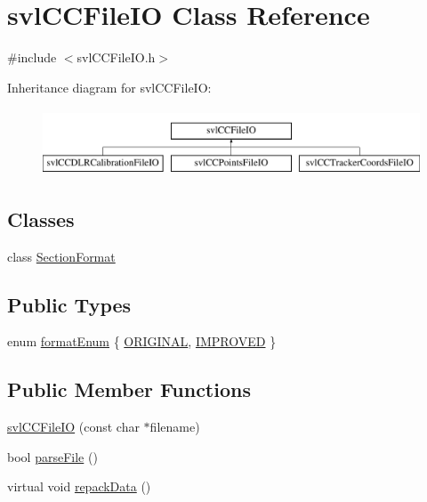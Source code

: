 \hypertarget{classsvl_c_c_file_i_o}{\section{svl\-C\-C\-File\-I\-O Class Reference}
\label{classsvl_c_c_file_i_o}
}


{\ttfamily \#include $<$svl\-C\-C\-File\-I\-O.\-h$>$}

Inheritance diagram for svl\-C\-C\-File\-I\-O\-:\begin{figure}[H]
\begin{center}
\leavevmode
\includegraphics[height=2.000000cm]{db/d3d/classsvl_c_c_file_i_o}
\end{center}
\end{figure}
\subsection*{Classes}
\begin{DoxyCompactItemize}
\item 
class \hyperlink{classsvl_c_c_file_i_o_1_1_section_format}{Section\-Format}
\end{DoxyCompactItemize}
\subsection*{Public Types}
\begin{DoxyCompactItemize}
\item 
enum \hyperlink{classsvl_c_c_file_i_o_a611d26ef01a82b0e1712aacd0994dfca}{format\-Enum} \{ \hyperlink{classsvl_c_c_file_i_o_a611d26ef01a82b0e1712aacd0994dfcaa7a3cb50b00a1186d5597ac007af54666}{O\-R\-I\-G\-I\-N\-A\-L}, 
\hyperlink{classsvl_c_c_file_i_o_a611d26ef01a82b0e1712aacd0994dfcaa170fa673651c22bf74d38e428f607d0b}{I\-M\-P\-R\-O\-V\-E\-D}
 \}
\end{DoxyCompactItemize}
\subsection*{Public Member Functions}
\begin{DoxyCompactItemize}
\item 
\hyperlink{classsvl_c_c_file_i_o_a7d06350895bcddeecb0a7ccf47b0fbbd}{svl\-C\-C\-File\-I\-O} (const char $\ast$filename)
\item 
bool \hyperlink{classsvl_c_c_file_i_o_a29c1a5e45b1243669045dd99a381146d}{parse\-File} ()
\item 
virtual void \hyperlink{classsvl_c_c_file_i_o_ab98a5780429fa2a83ffd118c00cf4d27}{repack\-Data} ()
\end{DoxyCompactItemize}
